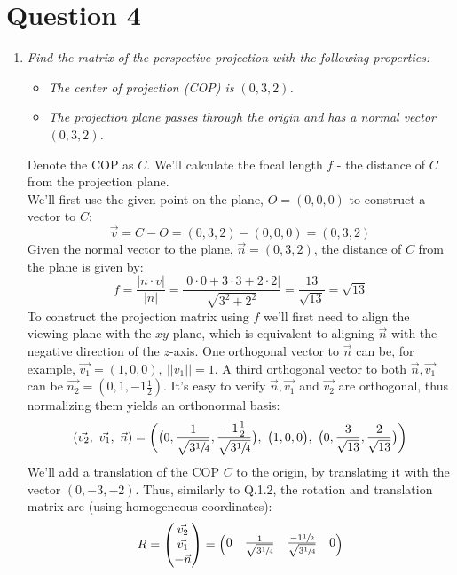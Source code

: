 \documentclass{article}
\newcommand{\question}[1]{\section*{Question #1}\vspace{.5cm}}
\newcommand{\norm}[1]{\vert\vert#1\vert\vert}
\begin{document}
    \newpage
    \question{4}
    \begin{enumerate}
        \item \textsl{Find the matrix of the perspective projection with the following properties:}
        \begin{itemize}
            \item \textsl{The center of projection (COP) is $(0,3,2)$.}
            \item \textsl{The projection plane passes through the origin and has a normal vector $(0,3,2)$.}
        \end{itemize}
        \vspace{.5cm}
        Denote the COP as $C$. We'll calculate the focal length $f$ - the distance of $C$ from the projection plane.\\
        We'll first use the given point on the plane, $O = (0,0,0)$ to construct a vector to $C$:
        $$\vec{v} = C - O = (0,3,2)-(0,0,0) = (0,3,2)$$
        Given the normal vector to the plane, $\vec{n} = (0,3,2)$, the distance of $C$ from the plane is given by:
        $$f = \dfrac{|n\cdot v|}{|n|} = \dfrac{|0\cdot 0 + 3\cdot 3 + 2\cdot 2|}{\sqrt{3^2+2^2}} = \dfrac{13}{\sqrt{13}} = \sqrt{13}$$
        To construct the projection matrix using $f$ we'll first need to align the viewing plane with the $xy$-plane, which is equivalent to aligning $\vec{n}$ with the negative direction of the $z$-axis. One orthogonal vector to $\vec{n}$ can be, for example, $\vec{v_1} = (1,0,0),\ \norm{v_1} = 1$. A third orthogonal vector to both $\vec{n},\vec{v_1}$ can be $\vec{n_2} = (0, 1, -1\frac{1}{2})$. It's easy to verify $\vec{n},\vec{v_1}$ and $\vec{v_2}$ are orthogonal, thus normalizing them yields an orthonormal basis:
        $$(\vec{v_2},\ \vec{v_1},\ \vec{n}) = \bigg(\big(0, \frac{1}{\sqrt{3\sfrac{1}{4}}},\frac{-1\frac{1}{2}}{\sqrt{3\sfrac{1}{4}}}\big),\ \big(1,0,0\big),\ \big(0,\frac{3}{\sqrt{13}},\frac{2}{\sqrt{13}}\big)\bigg)$$
        We'll add a translation of the COP $C$ to the origin, by translating it with the vector $(0,-3,-2)$.
        Thus, similarly to Q.1.2, the rotation and translation matrix are (using homogeneous coordinates):
        $$
            R = \begin{pmatrix}
                \vec{v_2}\\
                \vec{v_1}\\
                -\vec{n}
            \end{pmatrix} = \begin{pmatrix}
                0&\frac{1}{\sqrt{3\sfrac{1}{4}}}&\frac{-1\sfrac{1}{2}}{\sqrt{3\sfrac{1}{4}}}&0\\

\end{pmatrix}$$
\end{enumerate}
\end{document}

